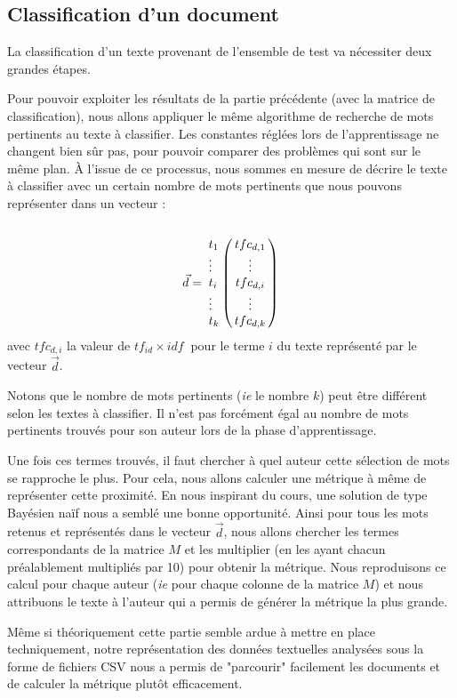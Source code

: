 \documentclass[a4paper,12pt]{report}
\begin{document}
\subsection{Classification d'un document}
La classification d'un texte provenant de l'ensemble de test va nécessiter deux grandes étapes. 

Pour pouvoir exploiter les résultats de la partie précédente (avec la matrice de classification), nous allons appliquer le même algorithme de recherche de mots pertinents au texte à classifier. Les constantes réglées lors de l'apprentissage ne changent bien sûr pas, pour pouvoir comparer des problèmes qui sont sur le même plan. À l'issue de ce processus, nous sommes en mesure de décrire le texte à classifier avec un certain nombre de mots pertinents que nous pouvons représenter dans un vecteur : 
\[
\vec{d}= \bordermatrix{
& \cr
t_{1} & tfc_{d,1} \cr
\vdots & \vdots \cr
t_{i} & tfc_{d,i} \cr
\vdots & \vdots \cr
t_{k} & tfc_{d,k} \cr
}
\]
avec $tfc_{d,i}$ la valeur de $tf_{id} \times idf\ $ pour le terme $i$ du texte représenté par le vecteur $\vec{d}$.

Notons que le nombre de mots pertinents (\textit{ie} le nombre $k$) peut être différent selon les textes à classifier. Il n'est pas forcément égal au nombre de mots pertinents trouvés pour son auteur lors de la phase d'apprentissage.

Une fois ces termes trouvés, il faut chercher à quel auteur cette sélection de mots se rapproche le plus. Pour cela, nous allons calculer une métrique à même de représenter cette proximité. En nous inspirant du cours, une solution de type Bayésien naïf nous a semblé une bonne opportunité. Ainsi pour tous les mots retenus et représentés dans le vecteur $\vec{d}$, nous allons chercher les termes correspondants de la matrice $M$ et les multiplier (en les ayant chacun préalablement multipliés par 10) pour obtenir la métrique. Nous reproduisons ce calcul pour chaque auteur (\textit{ie} pour chaque colonne de la matrice $M$) et nous attribuons le texte à l'auteur qui a permis de générer la métrique la plus grande.  

Même si théoriquement cette partie semble ardue à mettre en place techniquement, notre représentation des données textuelles analysées sous la forme de fichiers CSV nous a permis de "parcourir" facilement les documents et de calculer la métrique plutôt efficacement. 
\end{document}
